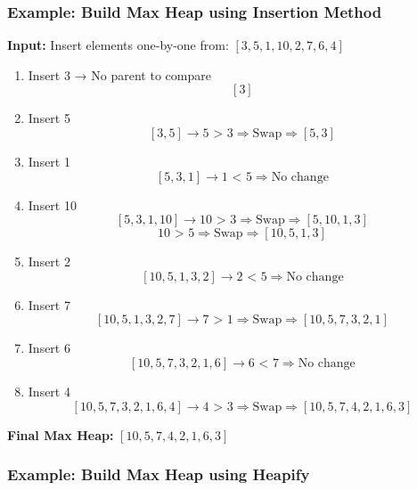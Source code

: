 \documentclass[14pt]{extarticle}
\begin{document}
\vspace{1em}
\newpage
\subsubsection*{Example: Build Max Heap using Insertion Method}

\textbf{Input:} Insert elements one-by-one from: \([3, 5, 1, 10, 2, 7, 6, 4]\)

\begin{enumerate}[leftmargin=*]
    \item Insert 3 → No parent to compare  
        \[
        [3]
        \]

    \item Insert 5  
        \[
        [3, 5] \rightarrow \text{5 > 3} \Rightarrow \text{Swap} \Rightarrow [5, 3]
        \]

    \item Insert 1  
        \[
        [5, 3, 1] \rightarrow \text{1 < 5} \Rightarrow \text{No change}
        \]

    \item Insert 10  
        \[
        [5, 3, 1, 10] \rightarrow \text{10 > 3} \Rightarrow \text{Swap} \Rightarrow [5, 10, 1, 3]
        \]
        \[
        \text{10 > 5} \Rightarrow \text{Swap} \Rightarrow [10, 5, 1, 3]
        \]

    \item Insert 2  
        \[
        [10, 5, 1, 3, 2] \rightarrow \text{2 < 5} \Rightarrow \text{No change}
        \]

    \item Insert 7  
        \[
        [10, 5, 1, 3, 2, 7] \rightarrow \text{7 > 1} \Rightarrow \text{Swap} \Rightarrow [10, 5, 7, 3, 2, 1]
        \]

    \item Insert 6  
        \[
        [10, 5, 7, 3, 2, 1, 6] \rightarrow \text{6 < 7} \Rightarrow \text{No change}
        \]

    \item Insert 4  
        \[
        [10, 5, 7, 3, 2, 1, 6, 4] \rightarrow \text{4 > 3} \Rightarrow \text{Swap} \Rightarrow [10, 5, 7, 4, 2, 1, 6, 3]
        \]
\end{enumerate}

\textbf{Final Max Heap:} \([10, 5, 7, 4, 2, 1, 6, 3]\)


\subsubsection*{Example: Build Max Heap using Heapify}
\end{document}
